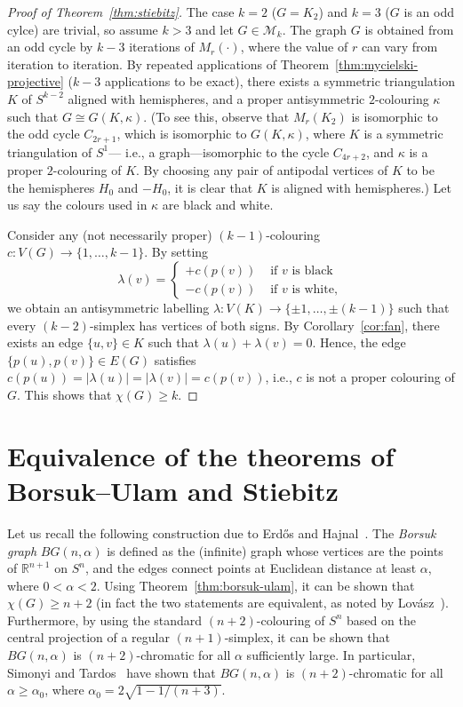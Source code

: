 \documentclass[11pt,a4paper]{amsart}
\begin{document}
\begin{proof}[Proof of Theorem~\ref{thm:stiebitz}]
  The case $k=2$ ($G = K_2$) and $k=3$ ($G$ is an odd cylce) are trivial,
  so assume $k > 3$ and let $G \in \mathcal M_k$.
  The graph $G$ is obtained from an odd cycle by $k-3$ iterations of $M_r(\cdot)$,
  where the value of $r$ can vary from iteration to iteration.
  By repeated applications of Theorem~\ref{thm:mycielski-projective}
  ($k-3$ applications to be exact), there exists a symmetric triangulation $K$ of
  $S^{k-2}$ aligned with hemispheres, and a proper antisymmetric $2$-colouring
  $\kappa$ such that $G \cong G(K, \kappa)$.
  (To see this, observe that $M_r(K_2)$ is isomorphic to the odd cycle $C_{2r+1}$, which is
  isomorphic to $G(K,\kappa)$, where $K$ is a symmetric triangulation of $S^1$---%
  i.e., a graph---isomorphic to the cycle $C_{4r+2}$, and $\kappa$ is a proper
  $2$-colouring of $K$. By choosing any pair of antipodal vertices of $K$ to
  be the hemispheres $H_0$ and $-H_0$, it is clear that $K$ is aligned with
  hemispheres.)
  Let us say the colours used in $\kappa$ are black and white.
  
  Consider any (not necessarily proper) $(k-1)$-colouring $c:V(G) \to \{1,\ldots,k-1\}$.
  By setting
  \[
    \lambda(v)=
    \begin{cases}
      +c(p(v)) &\text{ if $v$ is black}\\
      -c(p(v)) &\text{ if $v$ is white},
    \end{cases}
  \]
  we obtain an antisymmetric labelling $\lambda:V(K) \to \{\pm 1, \ldots, \pm(k-1)\}$
  such that every $(k-2)$-simplex has vertices of both signs.
  By Corollary~\ref{cor:fan}, there exists an edge $\{u,v\} \in K$ such that
  $\lambda(u)+\lambda(v) = 0$. Hence, the edge $\{p(u),p(v)\} \in E(G)$ satisfies
  $c(p(u))=|\lambda(u)|=|\lambda(v)|=c(p(v))$, i.e., $c$ is not a proper colouring of $G$.
  This shows that $\chi(G) \geq k$.
\end{proof}

\section{Equivalence of the theorems of Borsuk--Ulam and Stiebitz}

Let us recall the following construction due to Erd\H os and Hajnal~\cite{EH67}.
The \emph{Borsuk graph} $BG(n,\alpha)$ is defined as the (infinite) graph
whose vertices are the points of $\mathbb R^{n+1}$ on $S^n$, and the edges
connect points at Euclidean distance at least $\alpha$, where $0<\alpha<2$.
Using Theorem~\ref{thm:borsuk-ulam}, it can be shown that $\chi(G) \geq n+2$ (in fact the two
statements are equivalent, as noted by Lov\'asz~\cite{Lov78}). Furthermore, by using the
standard $(n+2)$-colouring of $S^n$ based on the central projection of a
regular $(n+1)$-simplex, it can be shown that $BG(n,\alpha)$ is $(n+2)$-chromatic
for all $\alpha$ sufficiently large. In particular, Simonyi and
Tardos~\cite{ST06} have shown that $BG(n,\alpha)$ is $(n+2)$-chromatic
for all $\alpha \geq \alpha_0$, where $\alpha_0=2 \sqrt{1-1/(n+3)}$.
\end{document}
